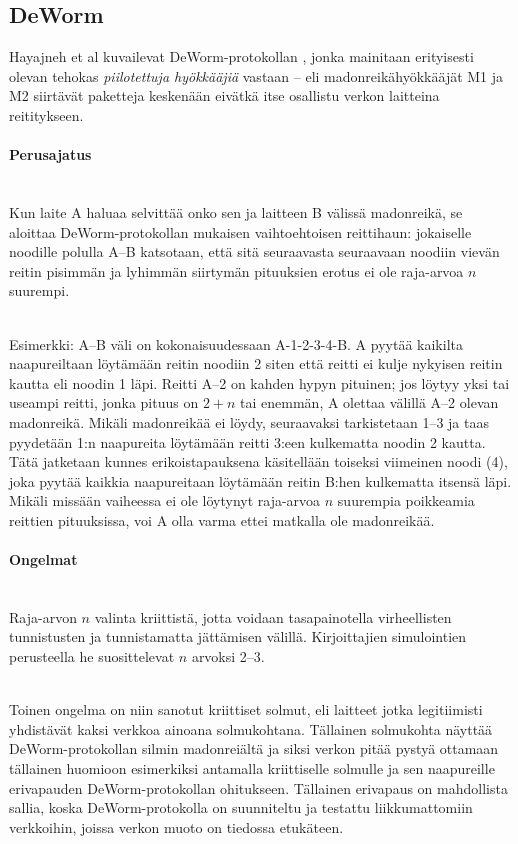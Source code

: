 \documentclass[finnish]{tktltiki2}
\theoremstyle{definition}
\theoremstyle{remark}
\begin{document}
% 
% 
% 
% 
% 
% 
% 
% 
% 
% 
% 
% 
% 
% 
\subsection{DeWorm}
% 
% 
% 
% 
% 
% 
% 
% 
% 
% 
% 
% 
% 
% 

Hayajneh et al kuvailevat DeWorm-protokollan \cite{deworm}, jonka mainitaan erityisesti olevan tehokas \emph{piilotettuja hyökkääjiä} vastaan -- eli madonreikähyökkääjät M1 ja M2 siirtävät paketteja keskenään eivätkä itse osallistu verkon laitteina reititykseen.

\paragraph{Perusajatus}
\noindent \\
Kun laite A haluaa selvittää onko sen ja laitteen B välissä madonreikä, se aloittaa DeWorm-protokollan mukaisen vaihtoehtoisen reittihaun: jokaiselle noodille polulla A--B katsotaan, että sitä seuraavasta seuraavaan noodiin vievän reitin pisimmän ja lyhimmän siirtymän pituuksien erotus ei ole raja-arvoa $n$ suurempi. 

\noindent \\
Esimerkki: A--B väli on kokonaisuudessaan A-1-2-3-4-B. A pyytää kaikilta naapureiltaan löytämään reitin noodiin 2 siten että reitti ei kulje nykyisen reitin kautta eli noodin 1 läpi. Reitti A--2 on kahden hypyn pituinen; jos löytyy yksi tai useampi reitti, jonka pituus on $2 + n$ tai enemmän, A olettaa välillä A--2 olevan madonreikä. Mikäli madonreikää ei löydy, seuraavaksi tarkistetaan 1--3 ja taas pyydetään 1:n naapureita löytämään reitti 3:een kulkematta noodin 2 kautta. Tätä jatketaan kunnes erikoistapauksena käsitellään toiseksi viimeinen noodi (4), joka pyytää kaikkia naapureitaan löytämään reitin B:hen kulkematta itsensä läpi. Mikäli missään vaiheessa ei ole löytynyt raja-arvoa $n$ suurempia poikkeamia reittien pituuksissa, voi A olla varma ettei matkalla ole madonreikää.

\paragraph{Ongelmat}
\noindent \\
Raja-arvon $n$ valinta kriittistä, jotta voidaan tasapainotella virheellisten tunnistusten ja tunnistamatta jättämisen välillä. Kirjoittajien simulointien perusteella he suosittelevat $n$ arvoksi 2--3.

\noindent \\
Toinen ongelma on niin sanotut kriittiset solmut, eli laitteet jotka legitiimisti yhdistävät kaksi verkkoa ainoana solmukohtana. Tällainen solmukohta näyttää DeWorm-protokollan silmin madonreiältä ja siksi verkon pitää pystyä ottamaan tällainen huomioon esimerkiksi antamalla kriittiselle solmulle ja sen naapureille erivapauden DeWorm-protokollan ohitukseen. Tällainen erivapaus on mahdollista sallia, koska DeWorm-protokolla on suunniteltu ja testattu liikkumattomiin verkkoihin, joissa verkon muoto on tiedossa etukäteen.
\end{document}
